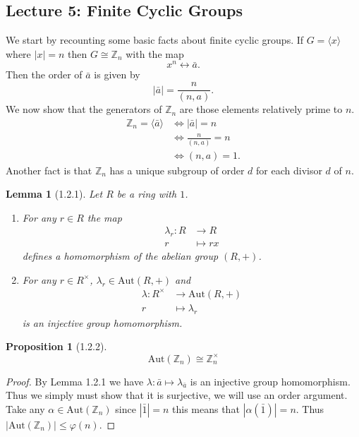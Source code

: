 \documentclass[11pt,leqno,oneside]{amsart}
\newcommand{\Z}{{\mathbb Z}} %
\newcommand{\isom}{\mathrel{\cong}}
\newcommand{\Aut}{\text{Aut}}  %
\newtheorem*{lem*}{Lemma}
\newtheorem*{prop*}{Proposition}
\theoremstyle{definition}
\numberwithin{equation}{section}
\begin{document}
\subsection*{Lecture 5: Finite Cyclic Groups}
We start by recounting some basic facts about finite cyclic groups. If
\(G=\langle x\rangle\) where \(|x|=n\) then \(G \isom \Z_n\) with the map
\[x^n \longleftrightarrow \bar{a}.\] Then the order of \(\bar{a}\) is given by
\[|\bar{a}|=\frac{n}{(n,a)}.\] We now show that the generators of \(\Z_n\) are
those elements relatively prime to \(n\).
\begin{align*}
  \Z_n = \langle \bar{a} \rangle &\iff |\bar{a}|=n\\
                                 &\iff \frac{n}{(n,a)}=n\\
                                 &\iff (n,a)=1.
\end{align*}
Another fact is that \(\Z_n\) has a unique subgroup of order \(d\) for each
divisor \(d\) of \(n\).
\begin{lem*}[1.2.1] Let \(R\) be a ring with \(1\).
  \begin{enumerate}
  \item[(a)] For any \(r \in R\) the map
    \begin{align*}
      \lambda_r \colon R &\to R\\
      r &\mapsto rx
    \end{align*}
    defines a homomorphism of the abelian group \((R,+)\).
  \item[(b)] For any \(r \in R^\times\), \(\lambda_r \in \Aut(R,+)\) and
    \begin{align*}
      \lambda \colon R^\times &\to \Aut(R,+)\\
      r &\mapsto \lambda_r
    \end{align*}
    is an injective group homomorphism.
  \end{enumerate}

\end{lem*}
\begin{prop*}[1.2.2]
  \[\Aut(\Z_n) \isom \Z_n^\times\]
\end{prop*}
\begin{proof}
  By Lemma 1.2.1 we have \(\lambda \colon \bar{a} \mapsto \lambda_{\bar{a}}\) is
  an injective group homomorphism. Thus we simply must show that it is
  surjective, we will use an order argument. Take any \(\alpha \in \Aut(\Z_n)\)
  since \(|\bar{1}|=n\) this means that \(|\alpha(\bar{1})|=n\). Thus
  \(|\Aut(\Z_n)| \le \varphi(n)\).
\end{proof}
\end{document}
